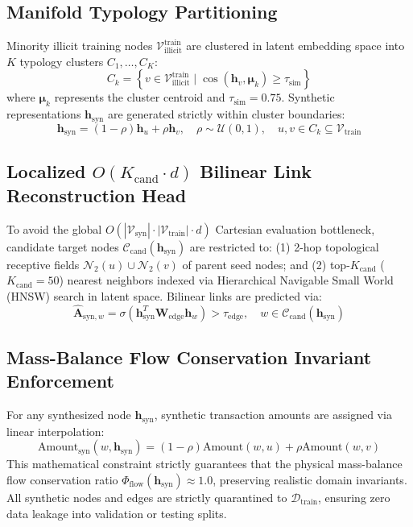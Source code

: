 \subsection{Manifold Typology Partitioning}
Minority illicit training nodes $\mathcal{V}_{\text{illicit}}^{\text{train}}$ are clustered in latent embedding space into $K$ typology clusters $C_1, \dots, C_K$:
\begin{equation}
\label{eq:typology_clustering}
C_k = \left\{ v \in \mathcal{V}_{\text{illicit}}^{\text{train}} \mid \cos(\mathbf{h}_v, \boldsymbol{\mu}_k) \ge \tau_{\text{sim}} \right\}
\end{equation}
where $\boldsymbol{\mu}_k$ represents the cluster centroid and $\tau_{\text{sim}} = 0.75$. Synthetic representations $\mathbf{h}_{\text{syn}}$ are generated strictly within cluster boundaries:
\begin{equation}
\label{eq:graphsmote_interp}
\mathbf{h}_{\text{syn}} = (1 - \rho) \mathbf{h}_u + \rho \mathbf{h}_v, \quad \rho \sim \mathcal{U}(0, 1), \quad u, v \in C_k \subseteq \mathcal{V}_{\text{train}}
\end{equation}

\subsection{\texorpdfstring{Localized $O(K_{\text{cand}} \cdot d)$ Bilinear Link Reconstruction Head}{Localized O(K\_cand * d) Bilinear Link Reconstruction Head}}
To avoid the global $O(|\mathcal{V}_{\text{syn}}| \cdot |\mathcal{V}_{\text{train}}| \cdot d)$ Cartesian evaluation bottleneck, candidate target nodes $\mathcal{C}_{\text{cand}}(\mathbf{h}_{\text{syn}})$ are restricted to: (1) 2-hop topological receptive fields $\mathcal{N}_2(u) \cup \mathcal{N}_2(v)$ of parent seed nodes; and (2) top-$K_{\text{cand}}$ ($K_{\text{cand}} = 50$) nearest neighbors indexed via Hierarchical Navigable Small World (HNSW) search in latent space. Bilinear links are predicted via:
\begin{equation}
\label{eq:bilinear_link}
\hat{\mathbf{A}}_{\text{syn}, w} = \sigma\left( \mathbf{h}_{\text{syn}}^T \mathbf{W}_{\text{edge}} \mathbf{h}_w \right) > \tau_{\text{edge}}, \quad w \in \mathcal{C}_{\text{cand}}(\mathbf{h}_{\text{syn}})
\end{equation}

\subsection{Mass-Balance Flow Conservation Invariant Enforcement}
For any synthesized node $\mathbf{h}_{\text{syn}}$, synthetic transaction amounts are assigned via linear interpolation:
\begin{equation}
\label{eq:amount_interp}
\text{Amount}_{\text{syn}}(w, \mathbf{h}_{\text{syn}}) = (1 - \rho) \text{Amount}(w, u) + \rho \text{Amount}(w, v)
\end{equation}
This mathematical constraint strictly guarantees that the physical mass-balance flow conservation ratio $\Phi_{\text{flow}}(\mathbf{h}_{\text{syn}}) \approx 1.0$, preserving realistic domain invariants. All synthetic nodes and edges are strictly quarantined to $\mathcal{D}_{\text{train}}$, ensuring zero data leakage into validation or testing splits.

